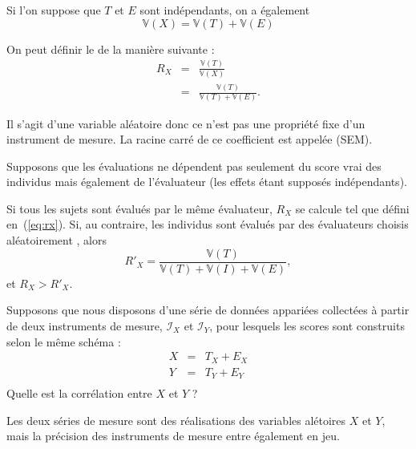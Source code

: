 Si l'on suppose que $T$ et $E$ sont indépendants, on a également
\[
\mathbb{V}(X) = \mathbb{V}(T)+\mathbb{V}(E)
\]

\foilhead{}
On peut définir le  de la manière suivante :
\begin{eqnarray}\label{eq:rx}
  R_X & = & \frac{\mathbb{V}(T)}{\mathbb{V}(X)}\nonumber\\
      & = & \frac{\mathbb{V}(T)}{\mathbb{V}(T)+\mathbb{V}(E)}.
\end{eqnarray}

Il s'agit d'une variable aléatoire donc ce n'est pas une propriété fixe d'un
instrument de mesure. La racine carré de ce coefficient est appelée
 (SEM).

Supposons que les évaluations ne dépendent pas seulement du score vrai des
individus mais également de l'évaluateur (les effets étant supposés
indépendants).

Si tous les sujets sont évalués par le même évaluateur, $R_X$ se calcule tel que
défini en~(\ref{eq:rx}). Si, au contraire, les individus sont évalués par des
évaluateurs choisis aléatoirement , alors
\begin{equation}\label{eq:rxprime}
    R'_X=\frac{\mathbb{V}(T)}{\mathbb{V}(T)+\mathbb{V}(I)+\mathbb{V}(E)},
\end{equation}
et $R_X^{}>R'_X$.

Supposons que nous disposons d'une série de données appariées collectées à
partir de deux instruments de mesure, $\mathcal{I}_X$ et $\mathcal{I}_Y$, pour
lesquels les scores sont construits selon le même schéma :
\begin{eqnarray*}
	X & = & T_X+E_X\\
	Y & = & T_Y+E_Y\\
\end{eqnarray*}
Quelle est la corrélation entre $X$ et $Y$ ?

Les\mark{} deux séries de mesure sont des réalisations des variables alétoires
$X$ et $Y$, mais la précision des instruments de mesure entre également en jeu.


